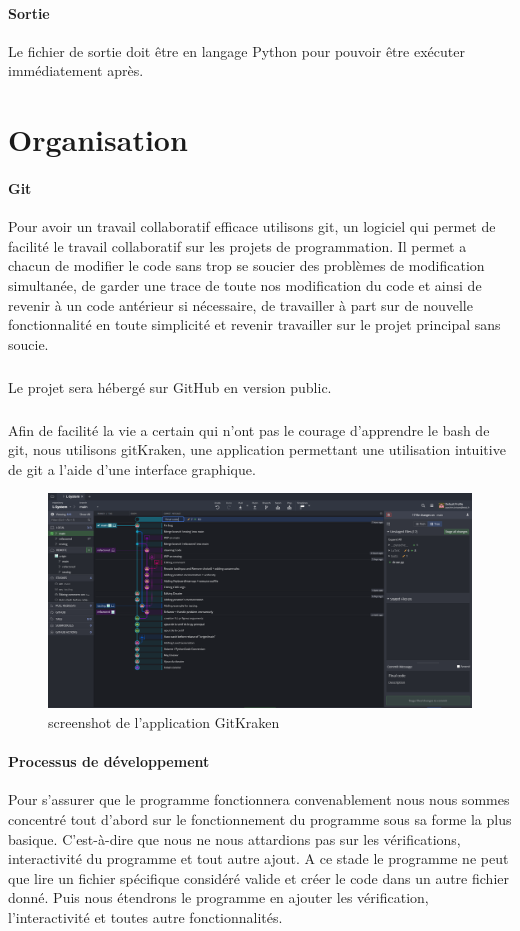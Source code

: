 \documentclass{report}
\begin{document}
		\paragraph{Sortie} Le fichier de sortie doit être en langage Python pour pouvoir être exécuter immédiatement après.
	
	\section{Organisation}
		\paragraph{Git}
			Pour avoir un travail collaboratif efficace utilisons git, un logiciel qui permet de facilité le travail collaboratif sur les projets de programmation. Il permet a chacun de modifier le code sans trop se soucier des problèmes de modification simultanée, de garder une trace de toute nos modification du code et ainsi de revenir à un code antérieur si nécessaire, de travailler à part sur de nouvelle fonctionnalité en toute simplicité et revenir travailler sur le projet principal sans soucie.
			\subparagraph{}	
Le projet sera hébergé sur GitHub en version public.
			\subparagraph{}
Afin de facilité la vie a certain qui n'ont pas le courage d'apprendre le bash de git, nous utilisons gitKraken, une application permettant une utilisation intuitive de git a l'aide d'une interface graphique.
			\begin{figure}[h]
				\begin{center}			
					\includegraphics[scale=0.335]{images/gitkraken.PNG}
					\caption{screenshot de l'application GitKraken}
				\end{center}
			\end{figure}

		\paragraph{Processus de développement}
			Pour s'assurer que le programme fonctionnera convenablement nous nous sommes concentré tout d'abord sur le fonctionnement du programme sous sa forme la plus basique. C'est-à-dire que nous ne nous attardions pas sur les vérifications, interactivité du programme et tout autre ajout. A ce stade le programme ne peut que lire un fichier spécifique considéré valide et créer le code dans un autre fichier donné. Puis nous étendrons le programme en ajouter les vérification, l'interactivité et toutes autre fonctionnalités.
 
\end{document}
